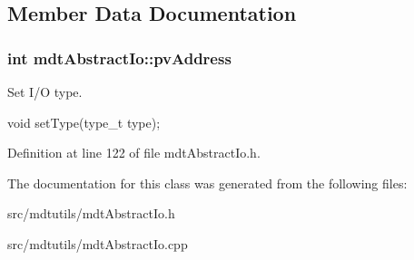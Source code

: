 \subsection{Member Data Documentation}
\hypertarget{classmdt_abstract_io_a45f50dbd2bafc248428e59f2c4c6272b}{
\subsubsection[{pvAddress}]{\setlength{\rightskip}{0pt plus 5cm}int {\bf mdtAbstractIo::pvAddress}}}
\label{classmdt_abstract_io_a45f50dbd2bafc248428e59f2c4c6272b}


Set I/O type. 

void setType(type\_\-t type); 

Definition at line 122 of file mdtAbstractIo.h.



The documentation for this class was generated from the following files:\begin{DoxyCompactItemize}
\item 
src/mdtutils/mdtAbstractIo.h\item 
src/mdtutils/mdtAbstractIo.cpp\end{DoxyCompactItemize}
